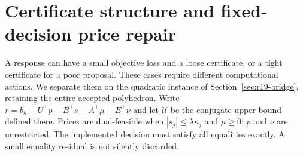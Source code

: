 \section{Certificate structure and fixed-decision price repair}\label{sec:r21-certification}
A response can have a small objective loss and a loose certificate, or a tight certificate for a poor proposal. These cases require different computational actions. We separate them on the quadratic instance of Section~\ref{sec:r19-bridge}, retaining the entire accepted polyhedron. Write
$r=b_h-U^\top p-B^\top s-A^\top\mu-E^\top\nu$ and let $\mathcal U$ be the conjugate upper bound defined there. Prices are dual-feasible when $|s_j|\leq\lambda\kappa_j$ and $\mu\geq0$; $p$ and $\nu$ are unrestricted. The implemented decision must satisfy all equalities exactly. A small equality residual is not silently discarded.

